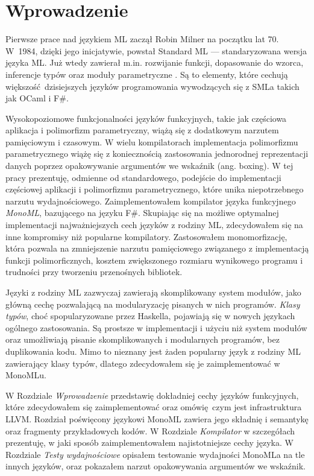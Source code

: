 \documentclass[declaration,shortabstract]{iithesis}
\author         {Mateusz Lewko}
\date           {}                     %
\begin{document}

\chapter{Wprowadzenie}
Pierwsze prace nad językiem ML zaczął Robin Milner na początku lat 70. W~1984, 
dzięki jego inicjatywie, powstał Standard ML --- standaryzowana wersja języka 
ML. Już wtedy zawierał m.in. rozwijanie funkcji, dopasowanie do wzorca, 
inferencje typów oraz moduły parametryczne \cite{sml_proposal}. Są to elementy,
które cechują większość dzisiejszych języków programowania 
wywodzących się z SMLa takich jak OCaml i F\#. 

Wysokopoziomowe funkcjonalności
języków funkcyjnych, takie jak częściowa aplikacja i polimorfizm parametryczny, 
wiążą się z dodatkowym narzutem pamięciowym i czasowym. W wielu kompilatorach 
implementacja polimorfizmu parametrycznego wiążę się z koniecznością 
zastosowania jednorodnej reprezentacji danych poprzez opakowywanie argumentów 
we wskaźnik (ang. boxing). W tej pracy prezentuję, odmienne od standardowego,
podejście do implementacji częściowej aplikacji i polimorfizmu parametrycznego, 
które unika niepotrzebnego narzutu wydajnościowego. Zaimplementowałem kompilator 
języka funkcyjnego \textit{MonoML}, bazującego na języku F\#. 
Skupiając się na możliwe optymalnej implementacji najważniejszych cech języków 
z rodziny ML, zdecydowałem się na inne kompromisy niż popularne kompilatory. 
Zastosowałem monomorfizację, która pozwala na zmniejszenie narzutu pamięciowego 
związanego z implementacją funkcji polimorficznych, kosztem zwiększonego 
rozmiaru wynikowego programu i trudności przy tworzeniu przenośnych 
bibliotek.

Języki z rodziny ML zazwyczaj zawierają skomplikowany system modułów, jako 
główną cechę pozwalającą na modularyzację pisanych w nich programów.
\textit{Klasy typów}, choć spopularyzowane przez Haskella, pojawiają
się w nowych językach ogólnego zastosowania. Są prostsze w implementacji
i użyciu niż system modułów oraz umożliwiają pisanie skomplikowanych i modularnych 
programów, bez duplikowania kodu. Mimo to nieznany jest żaden 
popularny język z rodziny ML zawierający klasy typów, dlatego zdecydowałem się je 
zaimplementować w MonoMLu.

W Rozdziale \textit{Wprowadzenie} przedstawię dokładniej cechy języków funkcyjnych, 
które zdecydowałem się zaimplementować oraz omówię czym jest infrastruktura LLVM. 
Rozdział poświęcony językowi MonoML zawiera jego składnię i semantykę oraz 
fragmenty przykładowych kodów. W Rozdziale \textit{Kompilator} w szczegółach
prezentuję, w jaki sposób zaimplementowałem najistotniejsze cechy języka.
W Rozdziale \textit{Testy wydajnościowe} opisałem testowanie wydajności MonoMLa
na tle innych języków, oraz pokazałem narzut opakowywania argumentów we wskaźnik.
\end{document}
